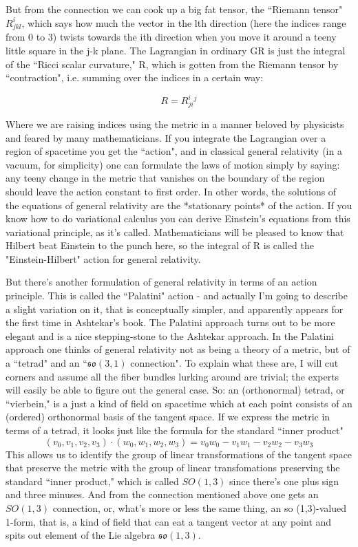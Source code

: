 But from the connection we can cook up a big fat tensor, the ``Riemann tensor" $R^i_{jkl}$, which says how much the vector in the lth direction (here the indices range from 0 to 3) twists towards the ith direction when you move it around a teeny little square in the j-k plane. The Lagrangian in ordinary GR is just the integral of the ``Ricci scalar curvature," R, which is gotten from the Riemann tensor by ``contraction", i.e. summing over the indices in a certain way:

\[R = R^i_{ji}^j\]

Where we are raising indices using the metric in a manner beloved by physicists and feared by many mathematicians. If you integrate the Lagrangian over a region of spacetime you get the ``action", and in classical general relativity (in a vacuum, for simplicity) one can formulate the laws of motion simply by saying: any teeny change in the metric that vanishes on the boundary of the region should leave the action constant to first order. In other words, the solutions of the equations of general relativity are the *stationary points* of the action. If you know how to do variational calculus you can derive Einstein's equations from this variational principle, as it's called. Mathematicians will be pleased to know that Hilbert beat Einstein to the punch here, so the integral of R is called the "Einstein-Hilbert" action for general relativity.

But there's another formulation of general relativity in terms of an action principle. This is called the ``Palatini" action - and actually I'm going to describe a slight variation on it, that is conceptually simpler, and apparently appears for the first time in Ashtekar's book. The Palatini approach turns out to be more elegant and is a nice stepping-stone to the Ashtekar approach. In the Palatini approach one thinks of general relativity not as being a theory of a metric, but of a ``tetrad" and an ``$\mathfrak{so(3,1)}$ connection". To explain what these are, I will cut corners and assume all the fiber bundles lurking around are trivial; the experts will easily be able to figure out the general case. So: an (orthonormal) tetrad, or ``vierbein," is a just a kind of field on spacetime which at each point consists of an (ordered) orthonormal basis of the tangent space. If we express the metric in terms of a tetrad, it looks just like the formula for the standard ``inner product"
\[(v_0,v_1,v_2,v_3)\cdot(w_0,w_1,w_2,w_3) = v_0w_0 - v_1w_1 - v_2w_2 - v_3w_3\]
This allows us to identify the group of linear transformations of the tangent space that preserve the metric with the group of linear transfomations preserving the standard ``inner product," which is called $SO(1,3)$ since there's one plus sign and three minuses. And from the connection mentioned above one gets an $SO(1,3)$ connection, or, what's more or less the same thing, an so (1,3)-valued 1-form, that is, a kind of field that can eat a tangent vector at any point and spits out element of the Lie algebra $\mathfrak{so}(1,3)$.

